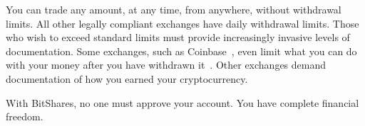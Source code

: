 You can trade any amount, at any time, from anywhere, without withdrawal
limits. All other legally compliant exchanges have daily withdrawal limits.
Those who wish to exceed standard limits must provide increasingly invasive
levels of documentation. Some exchanges, such as Coinbase~\cite{coinbase}, even
limit what you can do with your money after you have withdrawn
it~\cite{ct:compliance}.  Other exchanges demand documentation of how you
earned your cryptocurrency.

With BitShares, no one must approve your account. You have complete financial
freedom.
